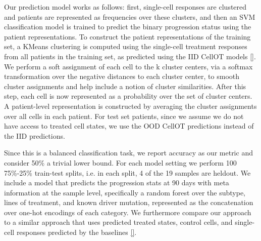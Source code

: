 Our prediction model works as follows: first, single-cell responses are clustered and patients are represented as frequencies over these clusters, and then an SVM classification model is trained to predict the binary progression status using the patient representations.
To construct the patient representations of the training set, a KMeans clustering is computed using the single-cell treatment responses from all patients in the training set, as predicted using the IID CellOT models \ref{}.
We perform a soft assignment of each cell to the k cluster centers, via a softmax transformation over the negative distances to each cluster center, to smooth cluster assignments and help include a notion of cluster similarities.
After this step, each cell is now represented as a probability over the set of cluster centers.
A patient-level representation is constructed by averaging the cluster assignments over all cells in each patient.
For test set patients, since we assume we do not have access to treated cell states, we use the OOD CellOT predictions instead of the IID predictions.

Since this is a balanced classification task, we report accuracy as our metric and consider 50\% a trivial lower bound.
For each model setting we perform 100 75\%-25\% train-test splits, i.e. in each split, 4 of the 19 samples are heldout.
We include a model that predicts the progression stats at 90 days with meta information at the sample level, specifically a random forest over the subtype, lines of treatment, and known driver mutation, represented as the concatenation over one-hot encodings of each category.
We furthermore compare our approach to a similar approach that uses predicted treated states, control cells, and single-cell responses predicted by the baselines \ref{}.
